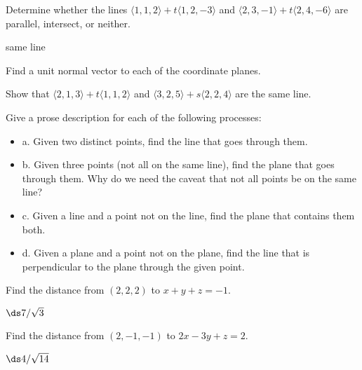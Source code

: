 \begin{exercises}
\begin{exercise}
\begin{exercise} Determine whether the lines $\langle 1,1,2\rangle+t\langle
1,2,-3\rangle$ and $\langle 2,3,-1\rangle+t\langle 2,4,-6\rangle$ are
parallel, intersect, or neither.
\begin{answer} same line
\end{answer}\end{exercise}

\begin{exercise} Find a unit normal vector to each of the coordinate planes.

\begin{exercise} Show that $\langle 2,1,3 \rangle + t \langle 1,1,2 \rangle$ and
$\langle 3, 2, 5 \rangle + s \langle 2, 2, 4 \rangle$ are the same
line.

\begin{exercise} Give a prose description for each of the following processes:

\begin{itemize} %

\item{a.} Given two distinct points, find the line that goes through them.

\item{b.} Given three points (not all on the same line), find the plane
  that goes through them. Why do we need the caveat that not all
  points be on the same line?

\item{c.} Given a line and a point not on the line, find the plane that
contains them both.

\item{d.} Given a plane and a point not on the plane, find the line that
is perpendicular to the plane through the given point.

\end{itemize}

\begin{exercise} Find the distance from $(2,2,2)$ to $x+y+z=-1$.
\begin{answer} $\ds 7/\sqrt3$
\end{answer}\end{exercise}

\begin{exercise} Find the distance from $(2,-1,-1)$ to $2x-3y+z=2$.
\begin{answer} $\ds 4/\sqrt{14}$
\end{answer}\end{exercise}


\end{exercise}
\end{exercise}
\end{exercise}
\end{exercise}
\end{exercises}
